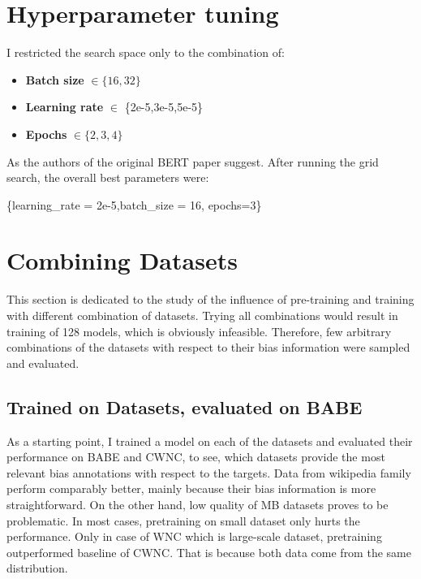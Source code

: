  
 

 
 
 
 
 
 \section{Hyperparameter tuning}
I restricted the search space only to the combination of:
 \begin{itemize}
     \item \textbf{Batch size} $\in \{16,32\}$
     \item \textbf{Learning rate} $\in $ \{2e-5,3e-5,5e-5\}
     \item \textbf{Epochs} $\in \{2,3,4\}$
 \end{itemize}
 
 As the authors of the original BERT paper suggest.  After running the grid search, the overall best parameters were:
 \begin{center}
      \{learning\_rate = 2e-5,batch\_size = 16, epochs=3\}
 \end{center}


 
 
 
 \section{Combining Datasets}
This section is dedicated to the study of the influence of pre-training and training with different combination of datasets. Trying all combinations would result in training of 128 models, which is obviously infeasible. Therefore, few arbitrary combinations of the datasets with respect to their bias information were sampled and evaluated.
 
 
 
 
 
 \subsection{Trained on Datasets, evaluated on BABE}
 As a starting point, I trained a model on each of the datasets and evaluated their performance on BABE and CWNC, to see, which datasets provide the most relevant bias annotations with respect to the targets. Data from wikipedia family perform comparably better, mainly because their bias information is more straightforward. On the other hand, low quality of MB datasets proves to be problematic. In most cases, pretraining on small dataset only hurts the performance. Only in case of WNC which is large-scale dataset, pretraining outperformed baseline of CWNC. That is because both data come from the same distribution.
 

